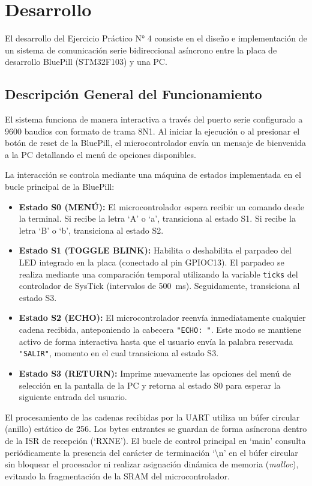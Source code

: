 \chapter{Desarrollo}

El desarrollo del Ejercicio Práctico N° 4 consiste en el diseño e implementación de un sistema de comunicación
serie bidireccional asíncrono entre la placa de desarrollo BluePill (STM32F103) y una PC.

\section{Descripción General del Funcionamiento}

El sistema funciona de manera interactiva a través del puerto serie configurado a $9600$ baudios con formato de
trama 8N1. Al iniciar la ejecución o al presionar el botón de reset de la BluePill, el microcontrolador envía un
mensaje de bienvenida a la PC detallando el menú de opciones disponibles.

La interacción se controla mediante una máquina de estados implementada en el bucle principal de la BluePill:
\begin{itemize}
  \item \textbf{Estado S0 (MENÚ):} El microcontrolador espera recibir un comando desde la terminal. Si recibe la
        letra `A' o `a', transiciona al estado S1. Si recibe la letra `B' o `b', transiciona al estado S2.
  \item \textbf{Estado S1 (TOGGLE BLINK):} Habilita o deshabilita el parpadeo del LED integrado en la placa
        (conectado al pin GPIOC13). El parpadeo se realiza mediante una comparación temporal utilizando la variable
        \lstinline{ticks} del controlador de SysTick (intervalos de \qty{500}{\ms}). Seguidamente, transiciona al estado S3.
  \item \textbf{Estado S2 (ECHO):} El microcontrolador reenvía inmediatamente cualquier cadena recibida,
        anteponiendo la cabecera \texttt{"ECHO: "}. Este modo se mantiene activo de forma interactiva hasta que el
        usuario envía la palabra reservada \texttt{"SALIR"}, momento en el cual transiciona al estado S3.
  \item \textbf{Estado S3 (RETURN):} Imprime nuevamente las opciones del menú de selección en la pantalla de la PC y
        retorna al estado S0 para esperar la siguiente entrada del usuario.
\end{itemize}

El procesamiento de las cadenas recibidas por la UART utiliza un búfer circular (anillo) estático de
\qty{256}{\byte}. Los bytes entrantes se guardan de forma asíncrona dentro de la ISR de recepción (`RXNE'). El
bucle de control principal en `main' consulta periódicamente la presencia del carácter de terminación `\textbackslash n'
en el búfer circular sin bloquear el procesador ni realizar asignación dinámica de memoria (\textit{malloc}), evitando
la fragmentación de la SRAM del microcontrolador.


